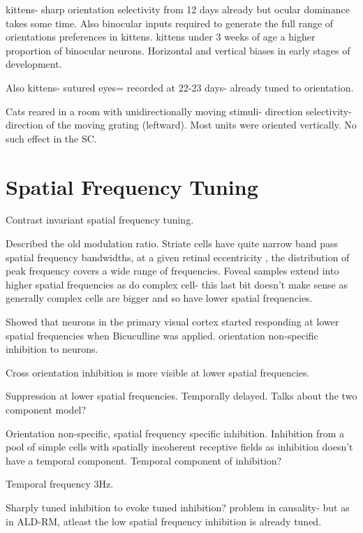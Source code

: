 \documentclass {report}
\begin{document}
\cite{Fregnac1978} kittens- sharp orientation selectivity from 12 days already but ocular dominance takes some time. Also binocular inputs required to generate the full range of orientations preferences in kittens. kittens under 3 weeks of age a higher proportion of binocular neurons. Horizontal and vertical biases in early stages of development.

\cite{Sherk1975} Also kittens- sutured eyes= recorded at 22-23 days- already tuned to orientation. 

\cite{Cynader1975} Cats reared in a room with unidirectionally moving stimuli- direction selectivity- direction of the moving grating (leftward). Most units were oriented vertically. No such effect in the SC. 

\section{Spatial Frequency Tuning}

\cite{Skottun1987} Contrast invariant spatial frequency tuning. 

\cite{DeValois1982a} Described the old modulation ratio. Striate cells have quite narrow band pass spatial frequency bandwidths, at a given retinal eccentricity , the distribution of peak frequency covers a wide range of frequencies.  Foveal samples extend into higher spatial frequencies as do complex cell- this last bit doesn't make sense as generally complex cells are bigger and so have lower spatial frequencies.

\cite{Vidyasagar1994a} Showed that neurons in the primary visual cortex started responding at lower spatial frequencies when Bicuculline was applied. orientation non-specific inhibition to neurons.

\cite{Meese2004} Cross orientation inhibition is more visible at lower spatial frequencies.

\cite{Bredfeldt2002a} Suppression at lower spatial frequencies. Temporally delayed. Talks about the two component model?

\cite{Bauman1991} Orientation non-specific, spatial frequency specific inhibition.  Inhibition from a pool of simple cells with spatially incoherent receptive fields as inhibition doesn't have a temporal component. Temporal component of inhibition?

Temporal frequency 3Hz.

Sharply tuned inhibition to evoke tuned inhibition? problem in causality- but as in ALD-RM, atleast the low spatial frequency inhibition is already tuned. 
\end{document}
